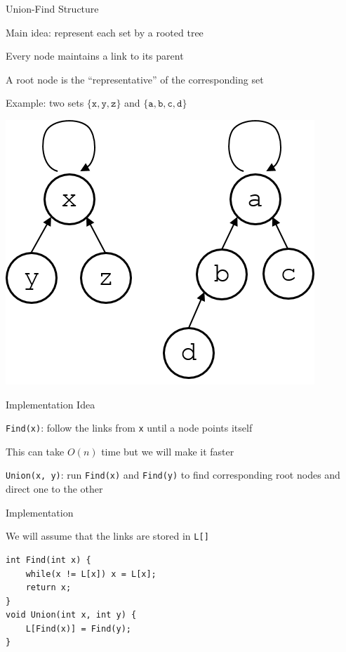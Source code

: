 \documentclass[13pt,onlymath]{beamer}
\begin{document}
\begin{frame}[fragile]{Union-Find Structure}
\BIT
\item Main idea: represent each set by a rooted tree
\BIT
\item Every node maintains a link to its parent
\item A root node is the ``representative'' of the corresponding set
\item Example: two sets $\{\mathtt{x}, \mathtt{y}, \mathtt{z}\}$ and $\{\mathtt{a}, \mathtt{b}, \mathtt{c}, \mathtt{d}\}$\EIT
\EIT
\begin{center}
\includegraphics[height=0.4\textheight]{figures/disjoint_set}
\end{center}
\end{frame}

\begin{frame}[fragile]{Implementation Idea}
\BIT
\item \verb.Find(x).: follow the links from \verb,x, until a node points itself
\BIT
\item This can take $O(n)$ time but we will make it faster
\EIT
\vfill
\item \verb.Union(x, y).: run \verb,Find(x), and \verb,Find(y), to find corresponding root nodes and direct one to the other
\EIT
\end{frame}

\begin{frame}[fragile]{Implementation}
\BIT
\item We will assume that the links are stored in \verb.L[].
\EIT
\vfill
\begin{Verbatim}[xleftmargin=25pt]
int Find(int x) {
    while(x != L[x]) x = L[x];
    return x;
}
void Union(int x, int y) {
    L[Find(x)] = Find(y);
}
\end{Verbatim}
\end{frame}
\end{document}
